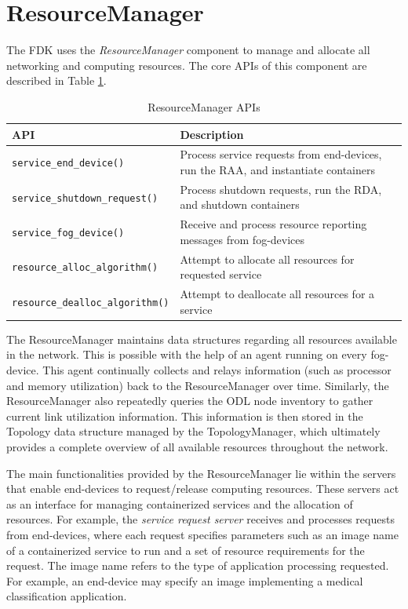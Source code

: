 \section{ResourceManager}
\label{ResourceManager}
The FDK uses the \textit{ResourceManager} component to manage and allocate all networking and computing resources.
The core APIs of this component are described in Table \ref{tab:resourceAPIs}.
%
%
\begin{table}[t]
    \centering
    \caption{ResourceManager APIs}
    \begin{tabular}{|l|p{8cm}|}
    \hline
    \textbf{API} & \textbf{Description} \\ \hline \hline
    \texttt{\scriptsize{service\_end\_device()}} & Process service requests from end-devices, run the RAA, and instantiate containers \\ \hline
    \texttt{\scriptsize{service\_shutdown\_request()}} & Process shutdown requests, run the RDA, and shutdown containers \\ \hline
    \texttt{\scriptsize{service\_fog\_device()}} & Receive and process resource reporting messages from fog-devices \\ \hline
    \texttt{\scriptsize{resource\_alloc\_algorithm()}} & Attempt to allocate all resources for requested service \\ \hline
    \texttt{\scriptsize{resource\_dealloc\_algorithm()}} & Attempt to deallocate all resources for a service \\ \hline
    \end{tabular}
    \label{tab:resourceAPIs}
\end{table}
%
%
The ResourceManager maintains data structures regarding all resources available in the network.
This is possible with the help of an agent running on every fog-device. 
This agent continually collects and relays information (such as processor and memory utilization) back to the ResourceManager over time.
Similarly, the ResourceManager also repeatedly queries the ODL node inventory to gather current link utilization information.
This information is then stored in the Topology data structure managed by the TopologyManager, which ultimately provides a complete overview of all available resources throughout the network.

The main functionalities provided by the ResourceManager lie within the servers that enable end-devices to request/release computing resources.
These servers act as an interface for managing containerized services and the allocation of resources. %
For example, the \textit{service request server} receives and processes requests from end-devices, where each request specifies parameters such as an image name of a containerized service to run and a set of resource requirements for the request.
The image name refers to the type of application processing requested. 
For example, an end-device may specify an image implementing a medical classification application.

